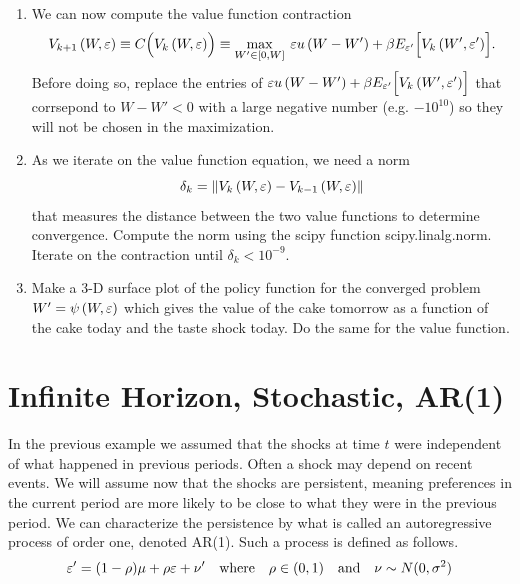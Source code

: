 \begin{problem}
\begin{enumerate}
   \item We can now compute the value function contraction
     \begin{equation}\label{EqContractStochiid}
      V_{k+1}\left(W,\varepsilon\right) \equiv C\Bigl(V_k\left(W,\varepsilon\right)\Bigr) \equiv \max_{W'\in[0,W]}\: \varepsilon u\left(W-W'\right) + \beta E_{\varepsilon'}\Bigl[V_k\left(W',\varepsilon'\right)\Bigr].
      \end{equation}
        Before doing so, replace the entries of $\varepsilon u\left(W-W'\right) + \beta E_{\varepsilon'}\Bigl[V_k\left(W',\varepsilon'\right)\Bigr]$ that corrsepond to $W-W' < 0$ with a large negative number (e.g. $-10^{10}$) so they will not be chosen in the maximization.

   \item As we iterate on the value function equation, we need a norm
    \begin{equation*}
        \delta_k = \left\lVert V_k\left(W,\varepsilon\right) - V_{k-1}\left(W,\varepsilon\right)\right\rVert
    \end{equation*}
    that measures the distance between the two value functions to determine convergence.  Compute the norm using the scipy function scipy.linalg.norm.  Iterate on the contraction until $\delta_k < 10^{-9}$.

   \item Make a 3-D surface plot of the policy function for the converged problem $W' = \psi\left(W,\varepsilon\right)$ which gives the value of the cake tomorrow as a function of the cake today  and the taste shock today.  Do the same for the value function.

\end{enumerate}
\end{problem}

\section*{Infinite Horizon, Stochastic, AR(1)}\label{SecRecProbInfinHorStochAR1}

In the previous example we assumed that the shocks at time $t$ were independent of what happened in previous periods.  Often a shock may depend on recent events.  We will assume now that the shocks are persistent, meaning preferences in the current period are more likely to be close to what they were in the previous period.  We can characterize the persistence by what is called an autoregressive process of order one, denoted AR(1).  Such a process is defined as follows.
\begin{equation}\label{EqAR1shock}
   \varepsilon' = (1-\rho)\mu + \rho\varepsilon + \nu' \quad\text{where}\quad \rho\in(0,1) \quad\text{and}\quad \nu\sim N(0,\sigma^2)
\end{equation}

